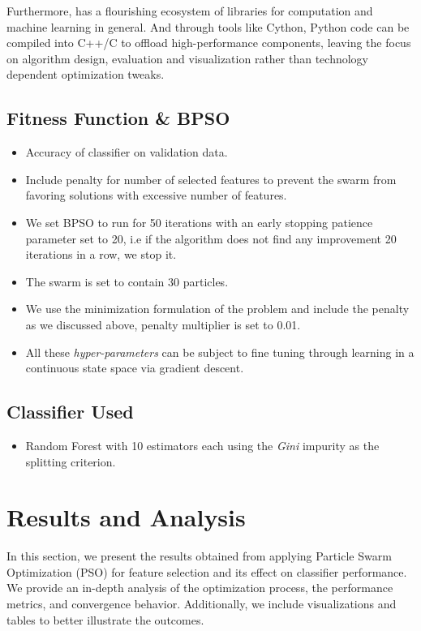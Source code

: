 \documentclass[12pt]{article}
\begin{document}
Furthermore, has a flourishing ecosystem of libraries for computation and machine learning in general. And through tools like Cython, Python code can be compiled into C++/C to offload high-performance components, leaving the focus on algorithm design, evaluation and visualization rather than technology dependent optimization tweaks.


\subsection{Fitness Function \& BPSO}
\begin{itemize}
    \item Accuracy of classifier on validation data.
    \item Include penalty for number of selected features to prevent the swarm from favoring solutions with excessive number of features.
    \item We set BPSO to run for 50 iterations with an early stopping patience parameter set to 20, i.e if the algorithm does not find any improvement 20 iterations in a row, we stop it.
    \item The swarm is set to contain 30 particles.
    \item We use the minimization formulation of the problem and include the penalty as we discussed above, penalty multiplier is set to 0.01.
    \item All these \textit{hyper-parameters} can be subject to fine tuning through learning in a continuous state space via gradient descent.
\end{itemize}

\subsection{Classifier Used}
\begin{itemize}
    \item Random Forest with 10 estimators each using the \textit{Gini} impurity as the splitting criterion.
\end{itemize}
\newpage
\section{Results and Analysis}

In this section, we present the results obtained from applying Particle Swarm Optimization (PSO) for feature selection and its effect on classifier performance. We provide an in-depth analysis of the optimization process, the performance metrics, and convergence behavior. Additionally, we include visualizations and tables to better illustrate the outcomes.
\end{document}
